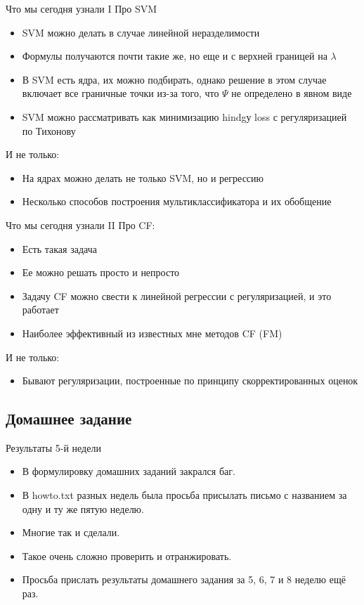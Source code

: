 \documentclass[14pt, fleqn, xcolor={dvipsnames, table}]{beamer}
\begin{document}
\begin{frame}{Что мы сегодня узнали I}
\small
Про SVM
\begin{itemize}
  \item SVM можно делать в случае линейной неразделимости
  \item Формулы получаются почти такие же, но еще и с верхней границей на $\lambda$
  \item В SVM есть ядра, их можно подбирать, однако решение в этом случае включает все граничные точки из-за того, что $\Psi$ не определено в явном виде
  \item SVM можно рассматривать как минимизацию hindgу loss с регуляризацией по Тихонову
\end{itemize}
И не только:
\begin{itemize}
  \item На ядрах можно делать не только SVM, но и регрессию
  \item Несколько способов построения мультиклассификатора и их обобщение
\end{itemize}
\end{frame}

\begin{frame}{Что мы сегодня узнали II}
\small
Про CF:
\begin{itemize}
  \item Есть такая задача
  \item Ее можно решать просто и непросто
  \item Задачу CF можно свести к линейной регрессии с регуляризацией, и это работает
  \item Наиболее эффективный из известных мне методов CF (FM)
\end{itemize}
И не только:
\begin{itemize}
  \item Бывают регуляризации, построенные по принципу скорректированных оценок
\end{itemize}
\end{frame}

\subsection{Домашнее задание}
\begin{frame}{Результаты 5-й недели}
\begin{itemize}
  \item В формулировку домашних заданий закрался баг.
  \item В howto.txt разных недель была просьба присылать письмо с названием за одну и ту же пятую неделю.
  \item Многие так и сделали.
  \item Такое очень сложно проверить и отранжировать.
  \item Просьба прислать результаты домашнего задания за 5, 6, 7 и 8 неделю ещё раз. 
\end{itemize}
\end{frame}
\end{document}
